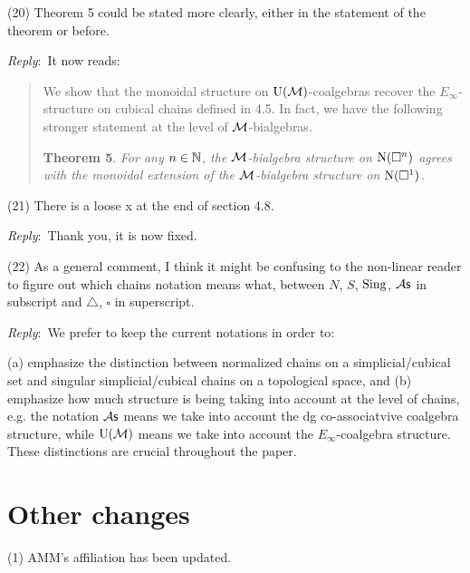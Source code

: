 \documentclass{amsart}
\newcommand{\ar}{\medskip\noindent\textit{Reply}:\ }
\newcommand{\rp}{\medskip\noindent}
\begin{document}
	(20) Theorem 5 could be stated more clearly, either in the statement of the theorem or before.

	\ar It now reads:
	\begin{quote}
		We show that the monoidal structure on ${\operatorname{U}(\mathcal{M})}$-coalgebras recover the $E_\infty$-structure on cubical chains defined in 4.5.
		In fact, we have the following stronger statement at the level of $\mathcal{M}$-bialgebras.

		\medskip\noindent\textbf{Theorem 5}.
		\textit{For any $n \in \mathbb{N}$, the $\mathcal{M}$-bialgebra structure on $\operatorname{N}(\square^n)$ agrees with the monoidal extension of the $\mathcal{M}$-bialgebra structure on $\operatorname{N}(\square^1)$.}
	\end{quote}

	\rp (21) There is a loose x at the end of section 4.8.

	\ar Thank you, it is now fixed.

	\rp (22) As a general comment, I think it might be confusing to the non-linear reader to figure out which chains notation means what, between $N$, $S$, $\operatorname{Sing}$, ${\mathcal{A}\mathsf{s}}$ in subscript and $\triangle$, $\square$ in superscript.

    \ar We prefer to keep the current notations in order to:
     
    (a) emphasize the distinction between normalized chains on a simplicial/cubical set and singular simplicial/cubical chains on a topological space, and (b) emphasize how much structure is being taking into account at the level of chains, e.g. the notation ${\mathcal{A}\mathsf{s}}$ means we take into account the dg co-associatvive coalgebra structure, while ${\operatorname{U}(\mathcal{M})}$ means we take into account the $E_{\infty}$-coalgebra structure.
    These distinctions are crucial throughout the paper. 
    
	\section{Other changes}

	\noindent (1) AMM's affiliation has been updated.

	\sloppy
	\printbibliography
\end{document}
